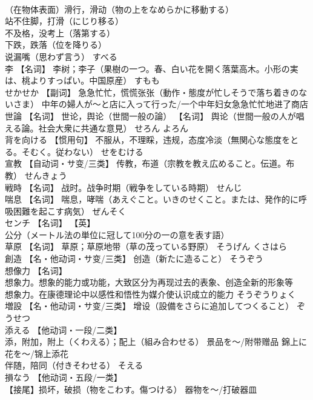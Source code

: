 \documentclass[8pt]{extreport}
\begin{document}
\begin{CJK}{UTF8}{min}
\\	（在物体表面）滑行，滑动（物の上をなめらかに移動する） 
\\	站不住脚，打滑（にじり移る） 
\\	不及格，没考上（落第する） 
\\	下跌，跌落（位を降りる） 
\\	说漏嘴（思わず言う）	すべる	
\\	李	【名词】 李树；李子（果樹の一つ。春、白い花を開く落葉高木。小形の実は、桃よりすっぱい。中国原産）	すもも	
\\	せかせか	【副词】 急急忙忙，慌慌张张（動作・態度が忙しそうで落ち着きのないさま） 中年の婦人が～と店に入って行った/一个中年妇女急急忙忙地进了商店		
\\	世論	【名词】 世论，舆论（世間一般の論） 【名词】 舆论（世間一般の人が唱える論。社会大衆に共通な意見）	せろん よろん	
\\	背を向ける	【惯用句】 不服从，不理睬，违规，态度冷淡（無関心な態度をとる。そむく。従わない）	せをむける	
\\	宣教	【自动词・サ变/三类】 传教，布道（宗教を教え広めること。伝道。布教）	せんきょう	
\\	戦時	【名词】 战时。战争时期（戦争をしている時期）	せんじ	
\\	喘息	【名词】 喘息，哮喘（あえぐこと。いきのせくこと。または、発作的に呼吸困難を起こす病気）	ぜんそく	
\\	センチ	【名词】 【英】
\\	公分（メートル法の単位に冠して100分の一の意を表す語）		
\\	草原	【名词】 草原；草原地带（草の茂っている野原）	そうげん くさはら	
\\	創造	【名・他动词・サ变/三类】 创造（新たに造ること）	そうぞう	
\\	想像力	【名词】 
\\	想象力。想象的能力或功能，大致区分为再现过去的表象、创造全新的形象等 
\\	想象力。在康德理论中以感性和悟性为媒介使认识成立的能力	そうぞうりょく	
\\	増設	【名・他动词・サ变/三类】 增设（設備をさらに追加してつくること）	ぞうせつ	
\\	添える	【他动词・一段/二类】 
\\	添，附加，附上（くわえる）；配上（組み合わせる） 景品を～/附带赠品 錦上に花を～/锦上添花 
\\	伴随，陪同（付きそわせる）	そえる	
\\	損なう	【他动词・五段/一类】 
\\	【接尾】损坏，破损（物をこわす。傷つける） 器物を～/打破器皿 

\end{CJK}
\end{document}
